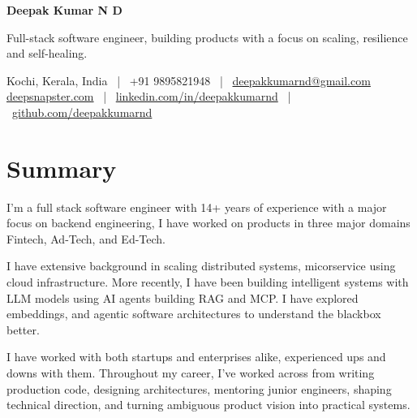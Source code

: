 \documentclass[10.5pt,a4paper]{article}
\begin{document}
{\Huge\bfseries\color{navy} Deepak Kumar N D}\par
\vspace{2pt}
{\large\color{graytext} Full-stack software engineer, building products with a focus on scaling, resilience and self-healing.}\par
\vspace{2pt}
{\small\color{graytext}
Kochi, Kerala, India \ | \ +91 9895821948 \ | \ \href{mailto:deepakkumarnd@gmail.com}{deepakkumarnd@gmail.com} \\
\href{https://deepsnapster.com}{deepsnapster.com} \ | \
\href{https://linkedin.com/in/deepakkumarnd}{linkedin.com/in/deepakkumarnd} \ | \
\href{https://github.com/deepakkumarnd}{github.com/deepakkumarnd}

}\par
\vspace{6pt}

\section{Summary}
I'm a full stack software engineer with 14+ years of experience with a major focus on backend engineering, I have worked on products in three major domains Fintech, Ad-Tech, and Ed-Tech.

I have extensive background in scaling distributed systems, micorservice using cloud infrastructure. More recently, I have been building intelligent systems with LLM models using AI agents building RAG and MCP. I have explored embeddings, and agentic software architectures to understand the blackbox better.

I have worked with both startups and enterprises alike, experienced ups and downs with them. Throughout my career, I've worked across from writing production code, designing architectures, mentoring junior engineers, shaping technical direction, and turning ambiguous product vision into practical systems.
\end{document}
